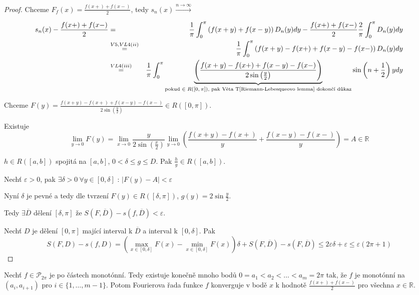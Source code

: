 \begin{proof}
Chceme $F_f(x) = \frac{f(x+) + f(x-)}{2}$, tedy $s_n(x) \overset{n \rightarrow \infty}{\rightarrow}$

\begin{eqnarray*}
s_n(x) - \frac{f(x+)+f(x-)}{2} & = & \frac{1}{\pi} \int_0^\pi \left( f(x+y) + f(x-y) \right) D_n(y) dy - \frac{f(x+) + f(x-)}{2} \frac{2}{\pi} \int_0^\pi D_n(y)dy \\
& \overset{V5, VL4 (ii)}{=} & \frac{1}{\pi} \int_0^\pi \left( f(x+y) - f(x+) + f(x-y) - f(x-) \right) D_n(y) dy \\
& \overset{VL4(iii)}{=} & \frac{1}{\pi} \int_{0}^\pi \underbrace{\left( \frac{f(x+y) - f(x+) + f(x-y) - f(x-)}{2 \sin \left( \frac{y}{2} \right)} \right)}_{\textrm{pokud $\in R([0,\pi])$, pak Věta T\ref{Riemann-Lebesqueovo lemma} dokončí důkaz}} \sin \left( n + \frac{1}{2} \right)y dy 
\end{eqnarray*}

Chceme $F(y) = \frac{f(x+y) - f(x+) + f(x-y) - f(x-)}{2 \sin \left( \frac{y}{2} \right)} \in R([0,\pi])$. 

Existuje
$$\lim_{y \rightarrow 0} F(y) = \lim_{x \rightarrow 0} \frac{y}{2 \sin \left( \frac{x}{2} \right)} \lim_{y \rightarrow 0} \left( \frac{f(x+y)-f(x+)}{y} + \frac{f(x-y)-f(x-)}{y} \right) = A \in \mathbb{R}$$

\begin{tvrzeni}
$h \in R([a,b])$ spojitá na $[a,b]$, $0 < \delta \leq g \leq D$. Pak $\frac{h}{g} \in R([a,b])$.
\end{tvrzeni}

Nechť $\varepsilon > 0$, pak $\exists \delta > 0 \ \forall y \in [0, \delta] \textrm{ : } |F(y)-A| < \varepsilon$

Nyní $\delta$ je pevné a tedy dle tvrzení $F(y) \in R([\delta, \pi])$, $g(y) = 2 \sin \frac{y}{2}$.

Tedy $\exists \overline{D}$ dělení $[\delta, \pi]$ že $S(F,\overline{D}) - s(f,\overline{D}) < \varepsilon$.

Nechť $D$ je dělení $[0,\pi]$ mající interval k $\overline{D}$ a interval k $[0, \delta]$. Pak 
$$S(F, D)-s(f,D) = \left( \max_{x \in [0, \delta]} F(x) - \min_{x \in [0, \delta]} F(x) \right) \delta + S(F, \overline{D}) - s(F, \overline{D}) \leq 2 \varepsilon \delta + \varepsilon \leq \varepsilon (2 \pi + 1)$$
\end{proof}

\begin{vetabd}
Nechť $f \in \mathcal{P}_{2\pi}$ je po částech monotónní. Tedy existuje konečně mnoho bodů $0=a_1 < a_2 < \ldots < a_m = 2 \pi$ tak, že $f$ je monotónní na $(a_i, a_{i+1})$ pro $i \in \{1, \ldots, m-1 \}$. Potom Fourierova řada funkce $f$ konverguje v bodě $x$ k hodnotě $\frac{f(x+) + f(x-)}{2}$ pro všechna $x \in \mathbb{R}$.
\end{vetabd}